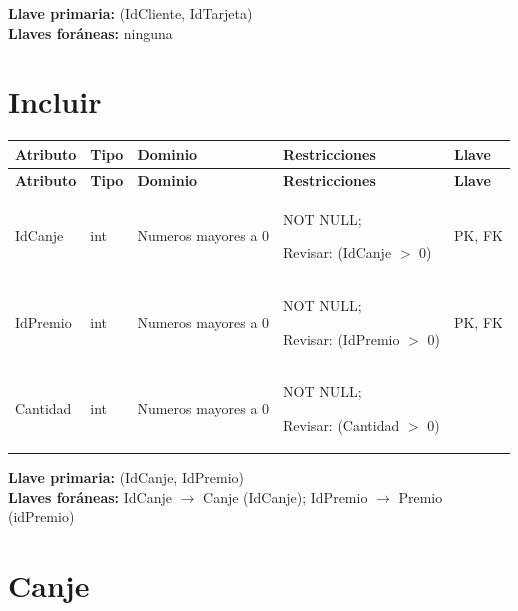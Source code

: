 \documentclass[12pt]{article}
\begin{document}
\textbf{Llave primaria:} (IdCliente, IdTarjeta)\\
\textbf{Llaves foráneas:} ninguna

 

\section*{Incluir}

\begin{longtable}{p{2.2cm} p{2.2cm} p{5.8cm} p{4.2cm} p{1.2cm}}
\label{tab:incluir}\\
\toprule
\textbf{Atributo} & \textbf{Tipo} & \textbf{Dominio} & \textbf{Restricciones} & \textbf{Llave} \\
\midrule
\endfirsthead

\toprule
\textbf{Atributo} & \textbf{Tipo} & \textbf{Dominio} & \textbf{Restricciones} & \textbf{Llave} \\
\midrule
\endhead

\bottomrule
\endfoot


IdCanje 
& int 
& Numeros mayores a 0
& NOT NULL;

Revisar: (IdCanje $>$ 0)
& PK, FK \\

IdPremio 
& int 
& Numeros mayores a 0
& NOT NULL;

Revisar: (IdPremio $>$ 0)
& PK, FK \\

Cantidad 
& int 
& Numeros mayores a 0
& NOT NULL;

Revisar: (Cantidad $>$ 0)
&  \\

\end{longtable}

\textbf{Llave primaria:} (IdCanje, IdPremio)\\
\textbf{Llaves foráneas:} IdCanje $\rightarrow$ Canje (IdCanje); IdPremio $\rightarrow$ Premio (idPremio)

 

\section*{Canje}
\end{document}
